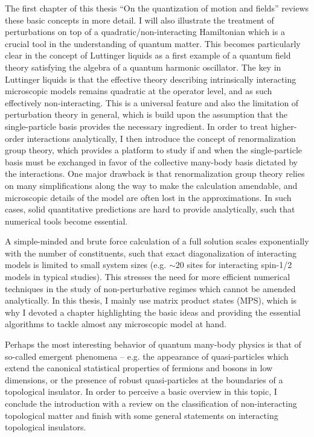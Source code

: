The first chapter of this thesis ``On the quantization of motion and fields'' reviews these basic concepts in more detail.
I will also illustrate the treatment of perturbations on top of a quadratic/non-interacting Hamiltonian which is a crucial tool in the understanding of quantum matter.
This becomes particularly clear in the concept of Luttinger liquids as a first example of a quantum field theory satisfying the algebra of a quantum harmonic oscillator.
The key in Luttinger liquids is that the effective theory describing intrinsically interacting microscopic models remains quadratic at the operator level, and as such effectively non-interacting.
This is a universal feature and also the limitation of perturbation theory in general, which is build upon the assumption that the single-particle basis provides the necessary ingredient.
In order to treat higher-order interactions analytically, I then introduce the concept of renormalization group theory, which provides a platform to study if and when the single-particle basis must be exchanged in favor of the collective many-body basis dictated by the interactions.
One major drawback is that renormalization group theory relies on many simplifications along the way to make the calculation amendable, and microscopic details of the model are often lost in the approximations.
In such cases, solid quantitative predictions are hard to provide analytically, such that numerical tools become essential.

A simple-minded and brute force calculation of a full solution scales exponentially with the number of constituents, such that exact diagonalization of interacting models is limited to small system sizes (e.g. $\sim 20$ sites for interacting spin-1/2 models in typical studies).
This stresses the need for more efficient numerical techniques in the study of non-perturbative regimes which cannot be amended analytically.
In this thesis, I mainly use matrix product states (MPS), which is why I devoted a chapter highlighting the basic ideas and providing the essential algorithms to tackle almost any microscopic model at hand.

Perhaps the most interesting behavior of quantum many-body physics is that of so-called emergent phenomena -- e.g. the appearance of quasi-particles which extend the canonical statistical properties of fermions and bosons in low dimensions, or the presence of robust quasi-particles at the boundaries of a topological insulator.
In order to perceive a basic overview in this topic, I conclude the introduction with a review on the classification of non-interacting topological matter and finish with some general statements on interacting topological insulators.

